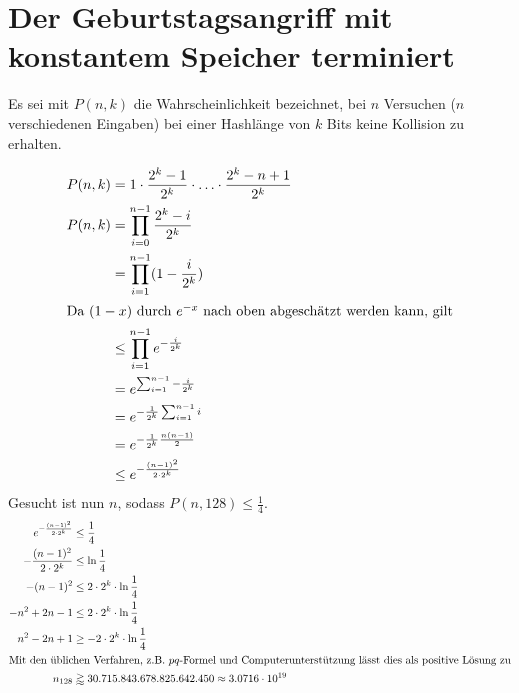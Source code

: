 \documentclass{../crypto}
\date{4. Dezember 2015}
\begin{document}
\maketitle

\section{Der Geburtstagsangriff mit konstantem Speicher terminiert}

Es sei mit $P(n,k)$ die Wahrscheinlichkeit bezeichnet, bei $n$ Versuchen ($n$
verschiedenen Eingaben) bei einer Hashlänge von $k$ Bits keine Kollision zu
erhalten.

\begin{align*}
   P(n,k)  & = 1 \cdot \frac{2^k - 1}{2^k} \cdot \ldots \cdot \frac{2^k - n + 1}{2^k} \\
   P(n,k)  & =   \prod_{i=0}^{n-1} \frac{2^k - i}{2^k}                                \\
           & =   \prod_{i=1}^{n-1} (1 -  \frac{i}{2^k})                               \\
\intertext{Da $(1-x)$ durch $e^{-x}$ nach oben abgeschätzt werden kann, gilt}
           & \le \prod_{i=1}^{n-1} e^{-\frac{i}{2^k}} \\
           & =   e^{\sum_{i=1}^{n-1}-\frac{i}{2^k}}   \\
           & =   e^{-\frac{1}{2^k}\sum_{i=1}^{n-1}i}  \\
           & =   e^{-\frac{1}{2^k} \frac{n(n-1)}{2}}  \\
           & \le   e^{-\frac{(n-1)^2}{2\cdot 2^k}}    \\
\end{align*}
Gesucht ist nun $n$, sodass $P(n,128) \le \frac{1}{4}$.
\begin{align*}
   e^{-\frac{(n-1)^2}{2\cdot 2^k}} & \le \frac{1}{4}                        \\
   -\frac{(n-1)^2}{2\cdot 2^k}     & \le \ln{\frac{1}{4}}                   \\
   -(n-1)^2                        & \le 2\cdot 2^k \cdot \ln{\frac{1}{4}}  \\
   -n^2 + 2n - 1                   & \le 2\cdot 2^k \cdot \ln{\frac{1}{4}}  \\
   n^2 - 2n + 1                    & \ge -2\cdot 2^k \cdot \ln{\frac{1}{4}} \\
   \intertext{Mit den üblichen Verfahren, z.B. $pq$-Formel und
   Computerunterstützung lässt dies als positive Lösung zu}
   n_{128}                         & \gtrapprox 30.715.843.678.825.642.450 \approx 3.0716 \cdot 10^{19}
\end{align*}
\end{document}
